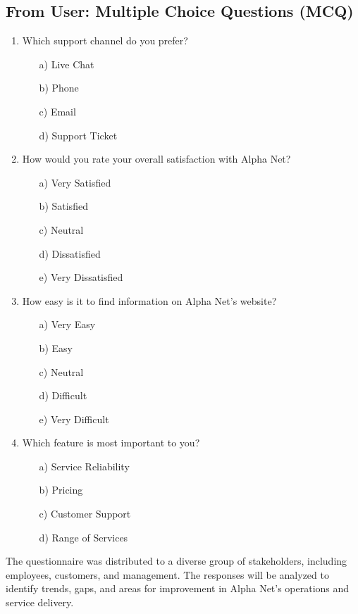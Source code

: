 \subsection*{From User: Multiple Choice Questions (MCQ)}
\begin{enumerate}
    \item Which support channel do you prefer?
    \begin{itemize}
        \item[a)] Live Chat
        \item[b)] Phone
        \item[c)] Email
        \item[d)] Support Ticket
    \end{itemize}
    \item How would you rate your overall satisfaction with Alpha Net?
    \begin{itemize}
        \item[a)] Very Satisfied
        \item[b)] Satisfied
        \item[c)] Neutral
        \item[d)] Dissatisfied
        \item[e)] Very Dissatisfied
    \end{itemize}
    \item How easy is it to find information on Alpha Net's website?
    \begin{itemize}
        \item[a)] Very Easy
        \item[b)] Easy
        \item[c)] Neutral
        \item[d)] Difficult
        \item[e)] Very Difficult
    \end{itemize}
    \item Which feature is most important to you?
    \begin{itemize}
        \item[a)] Service Reliability
        \item[b)] Pricing
        \item[c)] Customer Support
        \item[d)] Range of Services
    \end{itemize}
\end{enumerate}
The questionnaire was distributed to a diverse group of stakeholders, including employees, customers, and management. The responses will be analyzed to identify trends, gaps, and areas for improvement in Alpha Net's operations and service delivery.


